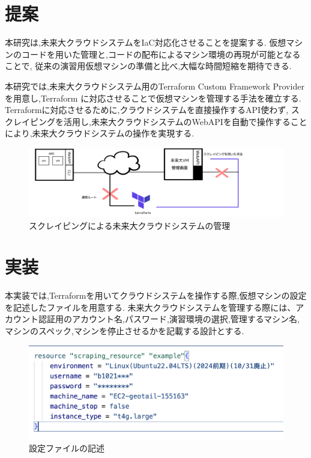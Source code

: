 \documentclass[11pt]{ujarticle}\sloppy
\begin{document}
\section{提案}


本研究は,未来大クラウドシステムをIaC対応化させることを提案する.
仮想マシンのコードを用いた管理と,コードの配布によるマシン環境の再現が可能となることで,
従来の演習用仮想マシンの準備と比べ,大幅な時間短縮を期待できる.

本研究では,未来大クラウドシステム用のTerraform Custom Framework Providerを用意し,Terraform に対応させることで仮想マシンを管理する手法を確立する.
Terraformに対応させるために,クラウドシステムを直接操作するAPI使わず,
スクレイピングを活用し,未来大クラウドシステムのWebAPIを自動で操作することにより,未来大クラウドシステムの操作を実現する.


\begin{figure}[h]
	\includegraphics[width=1\linewidth]{./images/scraping.png}
	\caption{スクレイピングによる未来大クラウドシステムの管理}
  \label{fig:scraping}
\end{figure}




\section{実装}



本実装では,Terraformを用いてクラウドシステムを操作する際,仮想マシンの設定を記述したファイルを用意する.
未来大クラウドシステムを管理する際には、アカウント認証用のアカウント名,パスワード,演習環境の選択,管理するマシン名,マシンのスペック,マシンを停止させるかを記載する設計とする.


\begin{figure}[h]
	\includegraphics[width=1\linewidth]{./images/machine.png}
	\caption{設定ファイルの記述}
  \label{fig:machien}
\end{figure}
\end{document}
